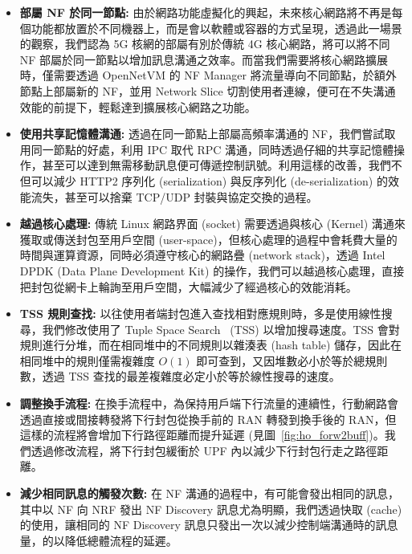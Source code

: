 \begin{itemize}
\item \textbf{部屬 NF 於同一節點:} 由於網路功能虛擬化的興起，未來核心網路將不再是每個功能都放置於不同機器上，而是會以軟體或容器的方式呈現，透過此一場景的觀察，我們認為 5G 核網的部屬有別於傳統 4G 核心網路，將可以將不同 NF 部屬於同一節點以增加訊息溝通之效率。而當我們需要將核心網路擴展時，僅需要透過 OpenNetVM 的 NF Manager 將流量導向不同節點，於額外節點上部屬新的 NF，並用 Network Slice 切割使用者連線，便可在不失溝通效能的前提下，輕鬆達到擴展核心網路之功能。
\item \textbf{使用共享記憶體溝通:} 透過在同一節點上部屬高頻率溝通的 NF，我們嘗試取用同一節點的好處，利用 IPC 取代 RPC 溝通，同時透過仔細的共享記憶體操作，甚至可以達到無需移動訊息便可傳遞控制訊號。利用這樣的改善，我們不但可以減少 HTTP2 序列化 (serialization) 與反序列化 (de-serialization) 的效能流失，甚至可以捨棄 TCP/UDP 封裝與協定交換的過程。
\item \textbf{越過核心處理:} 傳統 Linux 網路界面 (socket) 需要透過與核心 (Kernel) 溝通來獲取或傳送封包至用戶空間 (user-space)，但核心處理的過程中會耗費大量的時間與運算資源，同時必須遵守核心的網路疊 (network stack)，透過 Intel DPDK (Data Plane Development Kit) 的操作，我們可以越過核心處理，直接把封包從網卡上輪詢至用戶空間，大幅減少了經過核心的效能消耗。
\item \textbf{TSS 規則查找:} 以往使用者端封包進入查找相對應規則時，多是使用線性搜尋，我們修改使用了 Tuple Space Search~\cite{paper.TSS} (TSS) 以增加搜尋速度。TSS 會對規則進行分堆，而在相同堆中的不同規則以雜湊表 (hash table) 儲存，因此在相同堆中的規則僅需複雜度 $O(1)$ 即可查到，又因堆數必小於等於總規則數，透過 TSS 查找的最差複雜度必定小於等於線性搜尋的速度。
\item \textbf{調整換手流程:} 在換手流程中，為保持用戶端下行流量的連續性，行動網路會透過直接或間接轉發將下行封包從換手前的 RAN 轉發到換手後的 RAN，但這樣的流程將會增加下行路徑距離而提升延遲 (見圖~\ref{fig:ho_forw2buff})。我們透過修改流程，將下行封包緩衝於 UPF 內以減少下行封包行走之路徑距離。
\item \textbf{減少相同訊息的觸發次數:} 在 NF 溝通的過程中，有可能會發出相同的訊息，其中以 NF 向 NRF 發出 NF Discovery 訊息尤為明顯，我們透過快取 (cache) 的使用，讓相同的 NF Discovery 訊息只發出一次以減少控制端溝通時的訊息量，的以降低總體流程的延遲。
\end{itemize}


